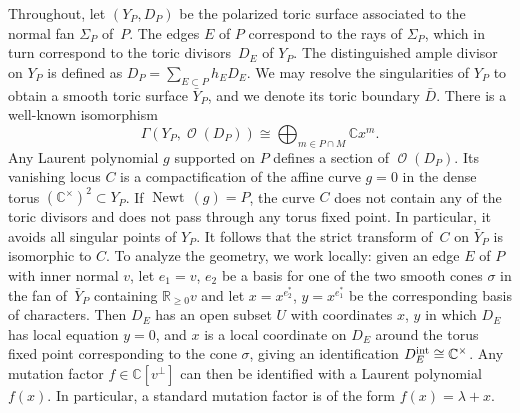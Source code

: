 \documentclass[pdftex]{sigma}
\numberwithin{equation}{section}
\DeclareMathOperator{\Newt}{{Newt \,}}
\DeclareMathOperator{\cO}{\mathcal{O}}
\newcommand{\CC}{\mathbb{C}}
\newcommand{\RR}{\mathbb{R}}
\begin{document}
	Throughout, let $(Y_P, D_P)$ be the polarized toric surface associated to the normal fan $\Sigma_P$ of~$P$. The edges $E$ of $P$ correspond to the rays of $\Sigma_P$, which in turn correspond to the toric divisors~$D_E$ of $Y_{P}$. The distinguished ample divisor on $Y_P$ is defined as
$D_P=\sum_{E \subset P} h_ED_E$.
	We may resolve the singularities of ${Y}_P$ to obtain a smooth toric surface $\bar{Y}_P$, and we denote its toric boundary $\bar{D}$.
	There is a well-known isomorphism
	\begin{equation}\label{eq:sections}
		\Gamma(Y_P, \cO(D_P)) \cong \bigoplus_{m \in P \cap M} \CC x^m.
	\end{equation}
Any Laurent polynomial $g$ supported on $P$ defines a section of $\cO(D_P)$. Its vanishing locus $C$ is a compactification of the affine curve $g=0$ in the dense torus $(\CC^\times)^2 \subset Y_P$. If $\Newt(g)=P$, the curve $C$ does not contain any of the toric divisors and does not pass through any torus fixed point. In particular, it avoids all singular points of $Y_P$.
	It follows that the strict transform of~$C$ on $\bar{Y}_P$ is isomorphic to $C$.
	To analyze the geometry, we work locally: given an edge $E$ of $P$ with inner normal $v$, let $e_1=v$, $e_2$ be a basis for one of the two smooth cones $\sigma$ in the fan of~$\bar{Y}_P$ containing $\RR_{\geq 0}v$ and let $x=x^{e_2^*}$, $y=x^{e_1^*}$ be the corresponding basis of characters. Then $D_E$ has an open subset $U$ with coordinates $x$, $y$ in which $D_E$ has local equation $y=0$, and $x$ is a local coordinate on $D_E$ around the torus fixed point corresponding to the cone $\sigma$, giving an identification $D_E^{\rm int} \cong \CC^\times$. Any mutation factor $f \in \CC[v^\perp]$ can then be identified with a Laurent polynomial $f(x)$. In particular, a standard mutation factor is of the form $f(x)=\lambda+x$.
	
\end{document}
